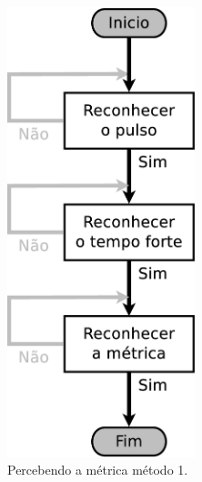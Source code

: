 \begin{figure}[h]
    \centering 
\begin{subfigure}[c]{0.45\textwidth}
\centering 
\includegraphics[width=0.6\textwidth]{chapters/cap-musicalidade/dancanopulso1.eps}
\caption{Percebendo a métrica método 1.}
\label{fig:fluxodancanopulso1}
\end{subfigure}
~%
\begin{subfigure}[c]{0.45\textwidth}
\centering 

\end{subfigure}
\end{figure}
